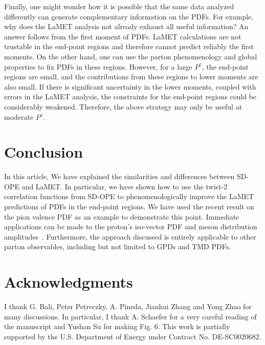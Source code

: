 \documentclass[prd,aps,twocolumn,preprintnumbers,showpacs,nofootinbib,superscriptaddress,notitlepage]{revtex4-2}
\begin{document}
Finally, one might wonder how it is possible that the same data analyzed differently can generate complementary information on the PDFs. For example, why does the LaMET analysis not already exhaust all useful information? An 
answer follows from the first moment of PDFs. LaMET calculations are
not trustable in the end-point regions and therefore cannot predict reliably  the first moments. On the other hand, one can use the parton phenomenology and global properties to fix PDFs in these regions.  However, for a large $P^z$, the end-point regions are small, and the contributions from these regions to lower moments are also small. If there is significant uncertainty in the lower moments, coupled with errors in the LaMET analysis, the
constraints for the end-point regions 
could be considerably weakened. Therefore, the above strategy may only be useful at moderate $P^z$. 


\section{Conclusion}

In this article, We have explained the similarities and differences between SD-OPE and LaMET. In particular, we have shown how to use the twist-2 correlation functions from SD-OPE to phenomenologically improve the LaMET predictions of PDFs in the end-point regions. 
We have used the recent result on the pion valence PDF as an example to demonstrate this point. Immediate applications can be made to the proton's iso-vector PDF
and meson distribution amplitudes~\cite{Hua:2022kcm}. Furthermore, the approach discussed is entirely applicable to other parton observables, including but not limited to GPDs and TMD PDFs.  

\section*{Acknowledgments}

I thank G. Bali, Peter Petreczky, A. Pineda, Jianhui Zhang and Yong Zhao for many discussions. In particular, I thank A. Schaefer for a very careful reading of the manuscript and Yushan Su for making Fig. 6. This work is partially supported by the U.S. Department of Energy under Contract No. DE-SC0020682.



\end{document}
